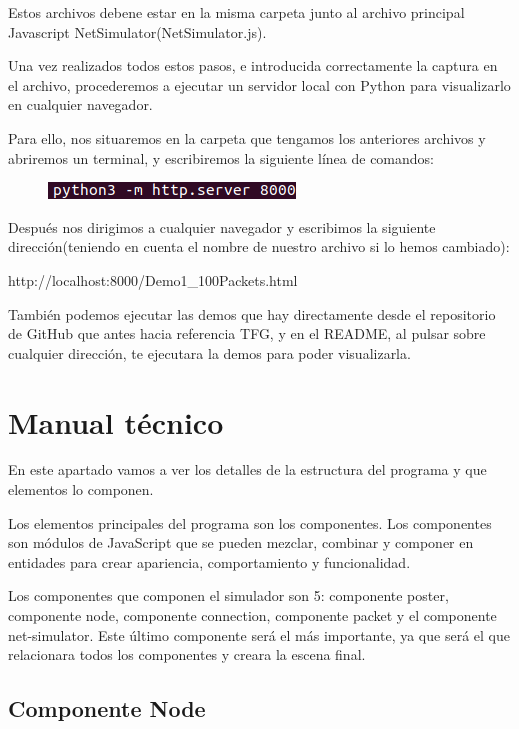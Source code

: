 \documentclass[a4paper, 12pt]{book}
\begin{document}
Estos archivos debene estar en la misma carpeta junto al archivo principal Javascript NetSimulator(NetSimulator.js).

Una vez realizados todos estos pasos, e introducida correctamente la captura en el archivo, procederemos a ejecutar un servidor local con Python para visualizarlo en cualquier navegador.

Para ello, nos situaremos en la carpeta que tengamos los anteriores archivos y abriremos un terminal, y escribiremos la siguiente línea de comandos:

\begin{figure}
\centering
    \includegraphics[scale=0.7]{img/server_python.png}
\end{figure}

\newpage
Después nos dirigimos a cualquier navegador y escribimos la siguiente dirección(teniendo en cuenta el nombre de nuestro archivo si lo hemos cambiado):

\begin{center}
http://localhost:8000/Demo1\_100Packets.html
\end{center}

También podemos ejecutar las demos que hay directamente desde el repositorio de GitHub que antes hacia referencia TFG, y en el README, al pulsar sobre cualquier dirección, te ejecutara la demos para poder visualizarla.

\section{Manual técnico}

En este apartado vamos a ver los detalles de la estructura
del programa y que elementos lo componen.

Los elementos principales del programa son los componentes. Los componentes son módulos de JavaScript que se pueden mezclar, combinar y componer en entidades para crear apariencia, comportamiento y funcionalidad.

Los componentes que componen el simulador son 5: componente poster, componente node, componente connection, componente packet y el componente net-simulator. Este último componente será el más importante, ya que será el que relacionara todos los componentes y creara la escena final.

\subsection{Componente Node}
\end{document}
